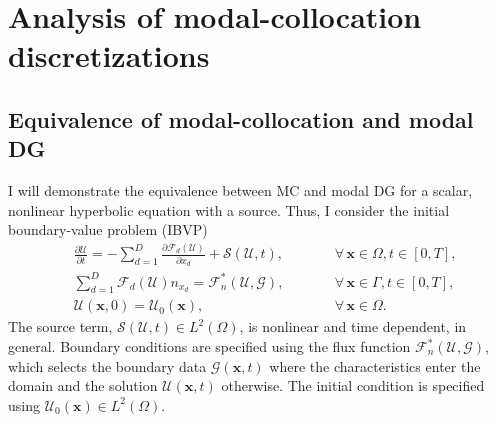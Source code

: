 \documentclass[pdflatex,sn-mathphys-num]{sn-jnl}%
\theoremstyle{thmstyleone}%
\theoremstyle{thmstyletwo}%
\theoremstyle{thmstylethree}%
\newcommand{\mat}[1]{\ensuremath{\mathsf{#1}}}
\newcommand{\fnc}[1]{\ensuremath{\mathcal{#1}}}
\begin{document}


\section{Analysis of modal-collocation discretizations}\label{sec:analysis}

\subsection{Equivalence of modal-collocation and modal DG}

I will demonstrate the equivalence between MC and modal DG for a scalar, nonlinear hyperbolic equation with a source. Thus, I consider the initial boundary-value problem (IBVP)
\begin{equation}\label{eq:hyperbolic}
\begin{alignedat}{2}
    &\frac{\partial \fnc{U}}{\partial t} = -\sum_{d=1}^{D} \frac{\partial \fnc{F}_d (\fnc{U})}{\partial x_d} + \fnc{S}(\fnc{U},t),&\qquad &\forall\, \bm{x} \in \Omega, t \in [0,T], \\
    &\sum_{d=1}^{D} \fnc{F}_d(\fnc{U}) n_{x_d} = \fnc{F}_n^*(\fnc{U},\fnc{G}), &\qquad&\forall\, \bm{x} \in \Gamma, t \in [0,T], \\
    &\fnc{U}(\bm{x},0) = \fnc{U}_0(\bm{x}),& \qquad &\forall\, \bm{x} \in \Omega.
\end{alignedat}
\end{equation}
The source term, $\fnc{S}(\fnc{U},t) \in L^2(\Omega)$, is nonlinear and time dependent, in general.  Boundary conditions are specified using the flux function $\fnc{F}_n^*(\fnc{U},\fnc{G})$, which selects the boundary data $\fnc{G}(\bm{x},t)$ where the characteristics enter the domain and the solution $\fnc{U}(\bm{x},t)$ otherwise.  The initial condition is specified using $\fnc{U}_0(\bm{x}) \in L^2(\Omega)$.
\end{document}
